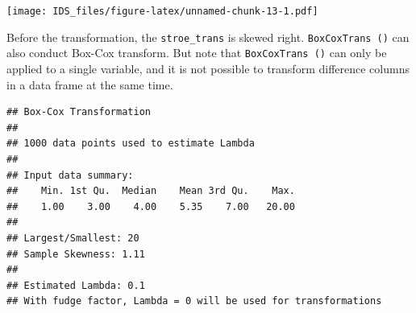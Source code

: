 \documentclass[12pt,]{krantz}
\makeatletter
\newenvironment{Shaded}{\begin{snugshade}}{\end{snugshade}}
\newcommand{\DataTypeTok}[1]{\textcolor[rgb]{0.27,0.27,0.27}{#1}}
\newcommand{\DecValTok}[1]{\textcolor[rgb]{0.06,0.06,0.06}{#1}}
\newcommand{\KeywordTok}[1]{\textcolor[rgb]{0.27,0.27,0.27}{\textbf{#1}}}
\newcommand{\NormalTok}[1]{#1}
\newcommand{\OperatorTok}[1]{\textcolor[rgb]{0.43,0.43,0.43}{\textbf{#1}}}
\newcommand{\StringTok}[1]{\textcolor[rgb]{0.5,0.5,0.5}{#1}}
\newenvironment{kframe}{%
\medskip{}
\setlength{\fboxsep}{.8em}
 \def\at@end@of@kframe{}%
 \ifinner\ifhmode%
  \def\at@end@of@kframe{\end{minipage}}%
  \begin{minipage}{\columnwidth}%
 \fi\fi%
 \def\FrameCommand##1{\hskip\@totalleftmargin \hskip-\fboxsep
 \colorbox{shadecolor}{##1}\hskip-\fboxsep
     \hskip-\linewidth \hskip-\@totalleftmargin \hskip\columnwidth}%
 \MakeFramed {\advance\hsize-\width
   \@totalleftmargin\z@ \linewidth\hsize
   \@setminipage}}%
 {\par\unskip\endMakeFramed%
 \at@end@of@kframe}
\renewenvironment{Shaded}{\begin{kframe}}{\end{kframe}}
\makeatother
\begin{document}
\begin{Shaded}
\end{Shaded}

\texttt{[image: IDS\_files/figure-latex/unnamed-chunk-13-1.pdf]}

Before the transformation, the \texttt{stroe\_trans} is skewed right.
\texttt{BoxCoxTrans\ ()} can also conduct Box-Cox transform. But note that \texttt{BoxCoxTrans\ ()} can only be applied to a single variable, and it is not possible to transform difference columns in a data frame at the same time.

\begin{Shaded}
\end{Shaded}

\begin{verbatim}
## Box-Cox Transformation
## 
## 1000 data points used to estimate Lambda
## 
## Input data summary:
##    Min. 1st Qu.  Median    Mean 3rd Qu.    Max. 
##    1.00    3.00    4.00    5.35    7.00   20.00 
## 
## Largest/Smallest: 20 
## Sample Skewness: 1.11 
## 
## Estimated Lambda: 0.1 
## With fudge factor, Lambda = 0 will be used for transformations
\end{verbatim}

\begin{Shaded}
\end{Shaded}
\end{document}
